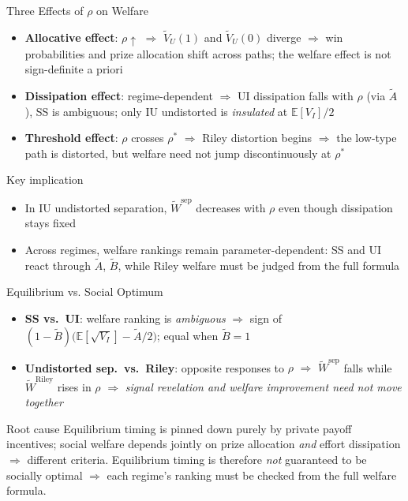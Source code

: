 \documentclass[aspectratio=169, 12pt]{beamer}
\newcommand{\E}{\mathbb{E}}
\newcommand{\VU}{\widetilde V_U}
\newcommand{\rhosep}{\rho^{*}}
\begin{document}
\begin{frame}{Three Effects of $\rho$ on Welfare}
  \begin{itemize}
    \item \textbf{Allocative effect}: $\rho\uparrow$ $\Rightarrow$
      $\VU(1)$ and $\VU(0)$ diverge $\Rightarrow$ win probabilities and prize
      allocation shift across paths; the welfare effect is not
      sign-definite a priori
    \item \textbf{Dissipation effect}: regime-dependent $\Rightarrow$
      UI dissipation falls with $\rho$ (via $\tilde A$), SS is
      ambiguous; only IU undistorted is \emph{insulated} at $\E[V_I]/2$
    \item \textbf{Threshold effect}: $\rho$ crosses $\rhosep$ $\Rightarrow$
      Riley distortion begins $\Rightarrow$ the low-type path is distorted,
      but welfare need not jump discontinuously at $\rhosep$
  \end{itemize}

  \begin{block}{Key implication}
    \begin{itemize}
      \item In IU undistorted separation, $\widetilde W^{\mathrm{sep}}$
        decreases with $\rho$ even though dissipation stays fixed
      \item Across regimes, welfare rankings remain parameter-dependent:
        SS and UI react through $\tilde A$, $\tilde B$,
        while Riley welfare must be judged from the full formula
    \end{itemize}
  \end{block}
\end{frame}

\begin{frame}{Equilibrium vs. Social Optimum}
  \begin{itemize}
    \setlength{\itemsep}{1em}
    \item \textbf{SS vs.\ UI}: welfare ranking is \emph{ambiguous} $\Rightarrow$
      sign of $(1-\tilde B)\bigl(\E[\sqrt{V_I}] - \tilde A/2\bigr)$;
      equal when $\tilde B = 1$
    \item \textbf{Undistorted sep.\ vs.\ Riley}: opposite responses to
      $\rho$ $\Rightarrow$ $\widetilde W^{\mathrm{sep}}$ falls while
      $\widetilde W^{\mathrm{Riley}}$ rises in $\rho$ $\Rightarrow$
      \emph{signal revelation and welfare improvement need not move
      together}
  \end{itemize}

  \vspace{0.4em}
  \begin{block}{Root cause}
    Equilibrium timing is pinned down purely by private payoff
    incentives; social welfare depends jointly on prize allocation
    \emph{and} effort dissipation $\Rightarrow$ different criteria.
    Equilibrium timing is therefore \emph{not} guaranteed to be socially
    optimal $\Rightarrow$ each regime's ranking must be checked from the full
    welfare formula.
  \end{block}
\end{frame}
\end{document}
